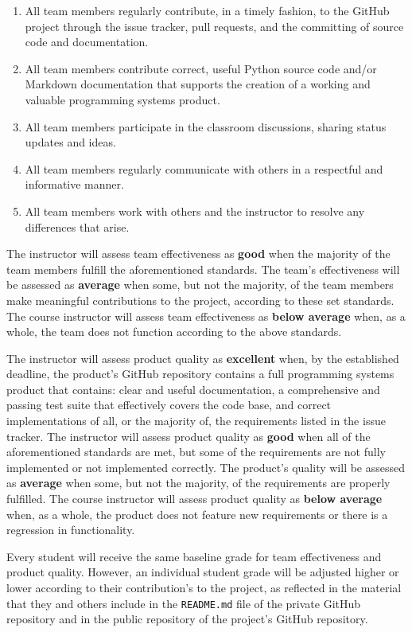 \documentclass[11pt]{article}
\newcommand{\reflection}{\lstinline{README.md}}
\begin{document}
\begin{enumerate}
  \setlength{\itemsep}{0pt}

  \item All team members regularly contribute, in a timely fashion, to the GitHub project through the issue tracker,
    pull requests, and the committing of source code and documentation.

  \item All team members contribute correct, useful Python source code and/or Markdown documentation that supports the
    creation of a working and valuable programming systems product.

  \item All team members participate in the classroom discussions, sharing status updates and ideas.

  \item All team members regularly communicate with others in a respectful and informative manner.

  \item All team members work with others and the instructor to resolve any differences that arise.

\end{enumerate}

\vspace*{-.5em}

The instructor will assess team effectiveness as {\bf good} when the majority of the team members fulfill the
aforementioned standards. The team's effectiveness will be assessed as {\bf average} when some, but not the majority, of
the team members make meaningful contributions to the project, according to these set standards. The course instructor
will assess team effectiveness as {\bf below average} when, as a whole, the team does not function according to the
above standards.

The instructor will assess product quality as {\bf excellent} when, by the established deadline, the product's GitHub
repository contains a full programming systems product that contains: clear and useful documentation, a comprehensive
and passing test suite that effectively covers the code base, and correct implementations of all, or the majority of,
the requirements listed in the issue tracker. The instructor will assess product quality as {\bf good} when all of the
aforementioned standards are met, but some of the requirements are not fully implemented or not implemented correctly.
The product's quality will be assessed as {\bf average} when some, but not the majority, of the requirements are
properly fulfilled. The course instructor will assess product quality as {\bf below average} when, as a whole, the
product does not feature new requirements or there is a regression in functionality.

Every student will receive the same baseline grade for team effectiveness and product quality. However, an individual
student grade will be adjusted higher or lower according to their contribution's to the project, as reflected in the
material that they and others include in the \reflection{} file of the private GitHub repository and in the public
repository of the project's GitHub repository.
\end{document}
